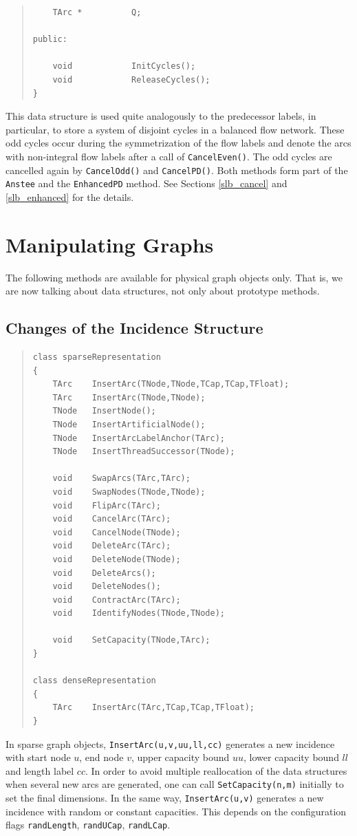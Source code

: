 \documentclass[a4paper,11pt,twoside]{book}
\begin{document}
\begin{multicols}{2}
\begin{quote}
\begin{verbatim}
    TArc *          Q;

public:

    void            InitCycles();
    void            ReleaseCycles();
}
\end{verbatim}
\end{quote}
This data structure is used quite analogously to the predecessor labels, in
particular, to store a system of disjoint cycles in a balanced flow network.
These odd cycles occur during the symmetrization of the flow labels and denote
the arcs with non-integral flow labels after a call of \verb/CancelEven()/.
The odd cycles are cancelled again by \verb/CancelOdd()/ and \verb/CancelPD()/.
Both methods form part of the \verb/Anstee/ and the \verb/EnhancedPD/ method.
See Sections \ref{slb_cancel} and \ref{slb_enhanced} for the details.


\section{Manipulating Graphs}
The following methods are available for physical graph objects only. That is,
we are now talking about data structures, not only about prototype methods.

\subsection{Changes of the Incidence Structure}
\methods
\begin{quote}
\begin{verbatim}
class sparseRepresentation
{
    TArc    InsertArc(TNode,TNode,TCap,TCap,TFloat);
    TArc    InsertArc(TNode,TNode);
    TNode   InsertNode();
    TNode   InsertArtificialNode();
    TNode   InsertArcLabelAnchor(TArc);
    TNode   InsertThreadSuccessor(TNode);

    void    SwapArcs(TArc,TArc);
    void    SwapNodes(TNode,TNode);
    void    FlipArc(TArc);
    void    CancelArc(TArc);
    void    CancelNode(TNode);
    void    DeleteArc(TArc);
    void    DeleteNode(TNode);
    void    DeleteArcs();
    void    DeleteNodes();
    void    ContractArc(TArc);
    void    IdentifyNodes(TNode,TNode);

    void    SetCapacity(TNode,TArc);
}

class denseRepresentation
{
    TArc    InsertArc(TArc,TCap,TCap,TFloat);
}
\end{verbatim}
\end{quote}
In sparse graph objects, \verb/InsertArc(u,v,uu,ll,cc)/ generates a new
incidence with start node $u$, end node $v$, upper capacity bound $uu$,
lower capacity bound $ll$ and length label $cc$. In order to avoid
multiple reallocation of the data structures when several new arcs are
generated, one can call \verb/SetCapacity(n,m)/ initially to set the final
dimensions. In the same way, \verb/InsertArc(u,v)/ generates a new
incidence with random or constant capacities. This depends on the configuration
flags \verb/randLength/, \verb/randUCap/, \verb/randLCap/.


\end{multicols}
\end{document}

